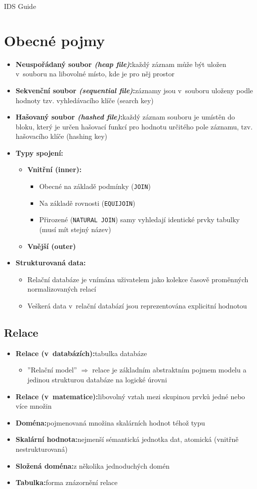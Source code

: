 \documentclass[a4paper,10pt]{article}
\newcommand{\pojem}[2]{\item \textbf{#1:}\quad #2}
\newcommand{\tedy}{$\Rightarrow$ }
\begin{document}
  {\Huge IDS Guide} \\[1cm]

  \vfill
  \tableofcontents

  \newpage
  \section{Obecné pojmy}
    \begin{itemize}

      \pojem{Neuspořádaný soubor \emph{(heap file)}}{každý záznam může být uložen v~souboru na libovolné místo, kde je pro něj prostor}
      \pojem{Sekvenční soubor \emph{(sequential file)}}{záznamy jsou v~souboru uloženy podle hodnoty tzv. vyhledávacího klíče (search key)}
      \pojem{Hašovaný soubor \emph{(hashed file)}}{každý záznam souboru je umístěn do bloku, který je určen hašovací funkcí pro hodnotu určitého pole záznamu, tzv. hašovacího klíče (hashing key)}

      \pojem{Typy spojení}
      \begin{itemize}
        \pojem{Vnitřní (inner)}
        \begin{itemize}
          \item Obecné na základě podmínky (\texttt{JOIN})
          \item Na základě rovnosti (\texttt{EQUIJOIN})
          \item Přirozené (\texttt{NATURAL JOIN}) samy vyhledají identické prvky tabulky (musí mít stejný název)
        \end{itemize}
        \item \textbf{Vnější (outer)}
      \end{itemize}

      \pojem{Strukturovaná data}
      \begin{itemize}
        \item Relační databáze je vnímána uživatelem jako kolekce časově proměnných normalizovaných relací
        \item Veškerá data v~relační databází jsou reprezentována explicitní hodnotou
      \end{itemize}
    \end{itemize}

    \subsection{Relace}
      \begin{itemize}
        \pojem{Relace (v~databázích)}{tabulka databáze}
        \begin{itemize}
          \item ''Relační model'' \tedy relace je základním abstraktním pojmem modelu a jedinou strukturou databáze na logické úrovni
        \end{itemize}
        \pojem{Relace (v~matematice)}{libovolný vztah mezi skupinou prvků jedné nebo více množin}

        \pojem{Doména}{pojmenovaná množina skalárních hodnot téhož typu}
        \pojem{Skalární hodnota}{nejmenší sémantická jednotka dat, atomická (vnitřně nestrukturovaná)}
        \pojem{Složená doména}{z několika jednoduchých domén}
        \pojem{Tabulka}{forma znázornění relace}
      \end{itemize}
\end{document}
